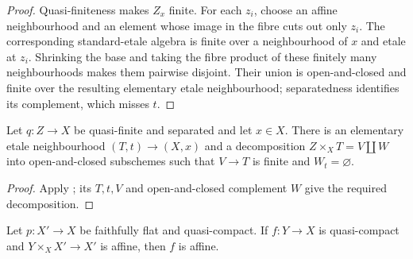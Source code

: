 \begin{proof}
  Quasi-finiteness makes $Z_x$ finite.  For each $z_i$, choose an affine
  neighbourhood and an element whose image in the fibre cuts out only $z_i$.
  The corresponding standard-etale algebra is finite over a neighbourhood of
  $x$ and etale at $z_i$.  Shrinking the base and taking the fibre product of
  these finitely many neighbourhoods makes them pairwise disjoint.  Their
  union is open-and-closed and finite over the resulting elementary etale
  neighbourhood; separatedness identifies its complement, which misses $t$.
\end{proof}

\begin{lemma}
  \label{lemma:nagata-quasifinite-etale-finite-part}

  Let $q\colon Z\to X$ be quasi-finite and separated and let $x\in X$.
  There is an elementary etale neighbourhood $(T,t)\to(X,x)$ and a
  decomposition $Z\times_XT=V\amalg W$ into open-and-closed subschemes such
  that $V\to T$ is finite and $W_t=\varnothing$.
\end{lemma}

\begin{proof}
  Apply ; its $T,t,V$
  and open-and-closed complement $W$ give the required decomposition.
\end{proof}

\begin{lemma}
  \label{lemma:nagata-affine-fpqc-descent-package}

  Let $p\colon X'\to X$ be faithfully flat and quasi-compact.  If
  $f\colon Y\to X$ is quasi-compact and $Y\times_XX'\to X'$ is affine, then
  $f$ is affine.
\end{lemma}

